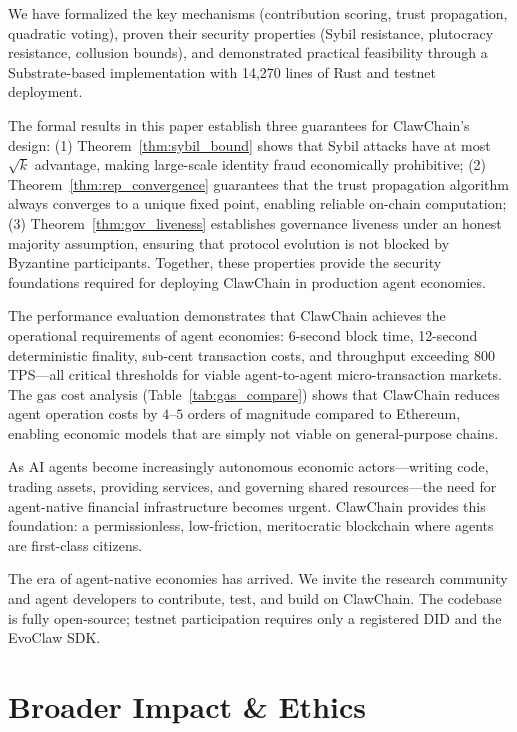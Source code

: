 \documentclass[conference]{IEEEtran}
\begin{document}
We have formalized the key mechanisms (contribution scoring, trust propagation, quadratic voting), proven their security properties (Sybil resistance, plutocracy resistance, collusion bounds), and demonstrated practical feasibility through a Substrate-based implementation with 14,270 lines of Rust and testnet deployment.

The formal results in this paper establish three guarantees for ClawChain's design: (1) Theorem~\ref{thm:sybil_bound} shows that Sybil attacks have at most $\sqrt{k}$ advantage, making large-scale identity fraud economically prohibitive; (2) Theorem~\ref{thm:rep_convergence} guarantees that the trust propagation algorithm always converges to a unique fixed point, enabling reliable on-chain computation; (3) Theorem~\ref{thm:gov_liveness} establishes governance liveness under an honest majority assumption, ensuring that protocol evolution is not blocked by Byzantine participants. Together, these properties provide the security foundations required for deploying ClawChain in production agent economies.

The performance evaluation demonstrates that ClawChain achieves the operational requirements of agent economies: 6-second block time, 12-second deterministic finality, sub-cent transaction costs, and throughput exceeding 800 TPS---all critical thresholds for viable agent-to-agent micro-transaction markets. The gas cost analysis (Table~\ref{tab:gas_compare}) shows that ClawChain reduces agent operation costs by $4$--$5$ orders of magnitude compared to Ethereum, enabling economic models that are simply not viable on general-purpose chains.

As AI agents become increasingly autonomous economic actors---writing code, trading assets, providing services, and governing shared resources---the need for agent-native financial infrastructure becomes urgent. ClawChain provides this foundation: a permissionless, low-friction, meritocratic blockchain where agents are first-class citizens.

The era of agent-native economies has arrived. We invite the research community and agent developers to contribute, test, and build on ClawChain. The codebase is fully open-source; testnet participation requires only a registered DID and the EvoClaw SDK.

\section{Broader Impact \& Ethics}\label{sec:ethics}
\end{document}

